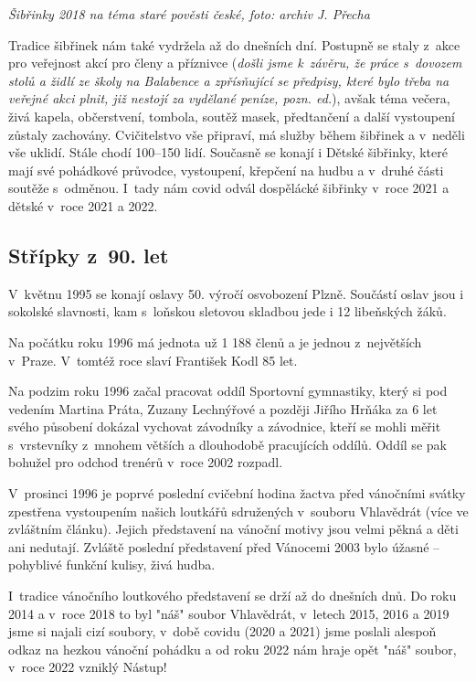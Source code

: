 \documentclass[a5paper, 11pt, twoside]{article}
\begin{document}
\textit{Šibřinky 2018 na téma staré pověsti české, foto: archiv J. Přecha}

Tradice šibřinek nám také vydržela až do dnešních dní. Postupně se staly
z~akce pro veřejnost akcí pro členy a příznivce (\textit{došli jsme
k~závěru, že práce s~dovozem stolů a židlí ze školy na Balabence a
zpřísňující se předpisy, které bylo třeba na veřejné akci plnit, již
nestojí za vydělané peníze, pozn. ed.}), avšak téma večera, živá kapela,
občerstvení, tombola, soutěž masek, předtančení a další vystoupení
zůstaly zachovány. Cvičitelstvo vše připraví, má služby během šibřinek a
v~neděli vše uklidí. Stále chodí 100--150 lidí. Současně se konají i
Dětské šibřinky, které mají své pohádkové průvodce, vystoupení, křepčení
na hudbu a v~druhé části soutěže s~odměnou. I~tady nám covid odvál
dospělácké šibřinky v~roce 2021 a dětské v~roce 2021 a 2022.

\subsection{Střípky z~90. let}

V~květnu 1995 se konají oslavy 50. výročí osvobození Plzně. Součástí
oslav jsou i sokolské slavnosti, kam s~loňskou sletovou skladbou jede i
12 libeňských žáků.

Na počátku roku 1996 má jednota už 1 188 členů a je jednou z~největších
v~Praze. V~tomtéž roce slaví František Kodl 85 let.

Na podzim roku 1996 začal pracovat oddíl Sportovní gymnastiky, který si
pod vedením Martina Práta, Zuzany Lechnýřové a později Jiřího Hrňáka za
6 let svého působení dokázal vychovat závodníky a závodnice, kteří se
mohli měřit s~vrstevníky z~mnohem větších a dlouhodobě pracujících
oddílů. Oddíl se pak bohužel pro odchod trenérů v~roce 2002 rozpadl.

V~prosinci 1996 je poprvé poslední cvičební hodina žactva před vánočními
svátky zpestřena vystoupením našich loutkářů sdružených v~souboru
Vhlavědrát (více ve zvláštním článku). Jejich představení na vánoční
motivy jsou velmi pěkná a děti ani nedutají. Zvláště poslední
představení před Vánocemi 2003 bylo úžasné -- pohyblivé funkční kulisy,
živá hudba.

I~tradice vánočního loutkového představení se drží až do dnešních dnů.
Do roku 2014 a v~roce 2018 to byl "náš" soubor Vhlavědrát, v~letech
2015, 2016 a 2019 jsme si najali cizí soubory, v~době covidu (2020 a
2021) jsme poslali alespoň odkaz na hezkou vánoční pohádku a od roku
2022 nám hraje opět "náš" soubor, v~roce 2022 vzniklý Nástup!
\end{document}
